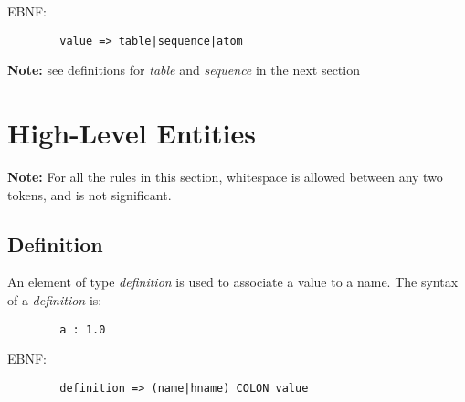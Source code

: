 \documentclass{memarticle}
\begin{document}
{                        \par
                        EBNF:
                        \begin{verbatim}
        value => table|sequence|atom
                        \end{verbatim}  
                        \par
                        \textbf{ Note: } see definitions for \emph{table} 
                        and \emph{sequence} 
                        in the next section
        \section{High-Level Entities}
                \textbf{ Note: } For all the rules in this section,
                whitespace is allowed between any two tokens,
                and is not significant.
                \subsection{Definition}
                        An element of type \emph{definition} is used to associate a value to a name.
                        The syntax of a \emph{definition} is:
                        \begin{verbatim}
        a : 1.0
                        \end{verbatim}
                        \par
                        EBNF:
                        \begin{verbatim}
        definition => (name|hname) COLON value
                        \end{verbatim}
}
\end{document}
